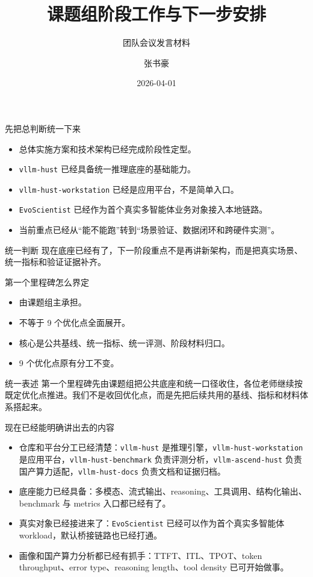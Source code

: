 \documentclass[aspectratio=169,11pt]{ctexbeamer}
\title{课题组阶段工作与下一步安排}
\subtitle{团队会议发言材料}
\author{张书豪}
\date{2026-04-01}
\begin{document}
\begin{frame}
  \titlepage
\end{frame}

\begin{frame}{先把总判断统一下来}
  \begin{itemize}
    \item 总体实施方案和技术架构已经完成阶段性定型。
    \item \texttt{vllm-hust} 已经具备统一推理底座的基础能力。
    \item \texttt{vllm-hust-workstation} 已经是应用平台，不是简单入口。
    \item \texttt{EvoScientist} 已经作为首个真实多智能体业务对象接入本地链路。
    \item 当前重点已经从“能不能跑”转到“场景验证、数据闭环和跨硬件实测”。
  \end{itemize}

  \vspace{0.5em}
  \begin{block}{统一判断}
    现在底座已经有了，下一阶段重点不是再讲新架构，而是把真实场景、统一指标和验证证据补齐。
  \end{block}
\end{frame}

\begin{frame}{第一个里程碑怎么界定}
  \begin{itemize}
    \item 由课题组主承担。
    \item 不等于 9 个优化点全面展开。
    \item 核心是公共基线、统一指标、统一评测、阶段材料归口。
    \item 9 个优化点原有分工不变。
  \end{itemize}

  \vspace{0.5em}
  \begin{block}{统一表述}
    第一个里程碑先由课题组把公共底座和统一口径收住，各位老师继续按既定优化点推进。我们不是收回优化点，而是先把后续共用的基线、指标和材料体系搭起来。
  \end{block}
\end{frame}

\begin{frame}{现在已经能明确讲出去的内容}
  \begin{itemize}
    \item 仓库和平台分工已经清楚：\texttt{vllm-hust} 是推理引擎，\texttt{vllm-hust-workstation} 是应用平台，\texttt{vllm-hust-benchmark} 负责评测分析，\texttt{vllm-ascend-hust} 负责国产算力适配，\texttt{vllm-hust-docs} 负责文档和证据归档。
    \item 底座能力已经具备：多模态、流式输出、reasoning、工具调用、结构化输出、benchmark 与 metrics 入口都已经有了。
    \item 真实对象已经接进来了：\texttt{EvoScientist} 已经可以作为首个真实多智能体 workload，默认桥接链路也已经打通。
    \item 画像和国产算力分析都已经有抓手：TTFT、ITL、TPOT、token throughput、error type、reasoning length、tool density 已可开始做事。
  \end{itemize}
\end{frame}
\end{document}
